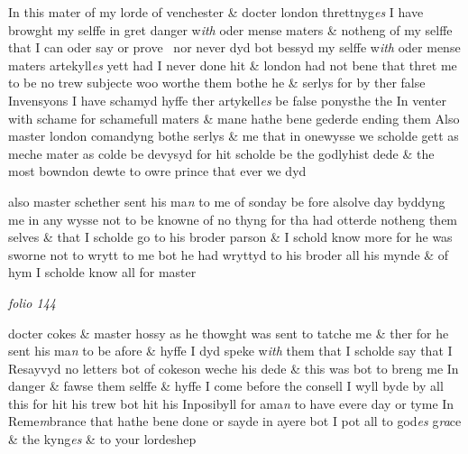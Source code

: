 \documentclass[12pt, a4paper]{book}
\begin{document}
 	
 		
				\marginpar[\vspace{0.5cm}{\textcolor{Gray}{n}}]{}
			
 		
		\ifthenelse{\isodd{\thepage}}
		{\reversemarginpar}
		{\normalmarginpar}
		In this mater of my lorde of venchester \& docter london threttnyg\textit{es} I
 have browght my selffe in gret danger w\textit{ith} oder mense maters \&
 notheng of my selffe that I can oder say or prove  nor never dyd bot bessyd
 my selffe w\textit{ith} oder mense maters artekyll\textit{es} yett had I never done hit \&
 			london had not bene that thret me to be no trew subjecte woo
 worthe them bothe he \& serlys for by ther false Invensyons I have
 schamyd hyffe ther artykell\textit{es} be false
			 ponysthe the In venter with schame
 for schamefull maters \& mane hathe bene gederde ending them
 Also master london comandyng bothe serlys \& me that in onewysse
 we scholde gett as meche mater as colde be devysyd for hit scholde be
 the godlyhist dede \& the most bowndon dewte to owre prince that ever we
 dyd
 	
 		
				\marginpar[\vspace{0.5cm}{\textcolor{Gray}{Shetheres servaunt}}]{}
			
 	
				\marginpar[\vspace{0.5cm}{\textcolor{Gray}{n}}]{}
			
 	
		\ifthenelse{\isodd{\thepage}}
		{\reversemarginpar}
		{\normalmarginpar}
		
 	also master schether sent his ma\textit{n} to me of sonday be fore alsolve day
 byddyng me in any wysse not to be knowne of no thyng for tha had
 otterde notheng them selves \& that I scholde go to his broder parson
			 \& I schold
 know more for he was sworne not to wrytt to me bot he had wryttyd
 to his broder all his mynde \& of hym I scholde know all for master

\dotfill
						\newpage
{}

\textit{folio 144}


 	
		\ifthenelse{\isodd{\thepage}}
		{\reversemarginpar}
		{\normalmarginpar}
		docter cokes \& master hossy as he thowght was sent to tatche me \& ther
 for he sent his ma\textit{n} to be afore \& hyffe I dyd speke w\textit{ith} them that I scholde
 say that I Resayvyd no letters bot of cokeson weche his dede \& this
 was bot to breng me In danger \& fawse them selffe \& hyffe I come
 before the consell I wyll byde by all this for hit his trew bot hit
 his Inposibyll for ama\textit{n} to have evere day or tyme In Reme\textit{m}brance
 that hathe bene done or sayde in ayere bot I pot all to god\textit{es} g\textit{ra}ce
 		\& the kyng\textit{es} \& to
			 your lordeshep
 	
\end{document}
